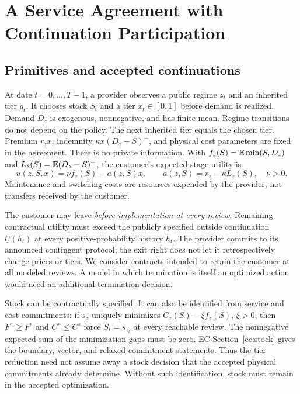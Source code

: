 \documentclass[11pt,letterpaper]{article}
\theoremstyle{definition}\newtheorem{assumption}[theorem]{Assumption}
\begin{document}
\section{A Service Agreement with Continuation Participation}\label{sec:model}
\subsection{Primitives and accepted continuations}
At date $t=0,\ldots,T-1$, a provider observes a public regime $z_t$ and an inherited tier $q_t$. It chooses stock $S_t$ and a tier $x_t\in[0,1]$ before demand is realized. Demand $D_z$ is exogenous, nonnegative, and has finite mean. Regime transitions do not depend on the policy. The next inherited tier equals the chosen tier. Premium $r_zx$, indemnity $\kappa x(D_z-S)^+$, and physical cost parameters are fixed in the agreement. There is no private information. With $f_z(S)=\mathbb E\min(S,D_z)$ and $L_z(S)=\mathbb E(D_z-S)^+$, the customer's expected stage utility is
\begin{equation}\label{eq:customer}
 u(z,S,x)=\nu f_z(S)-a(z,S)x,\qquad a(z,S)=r_z-\kappa L_z(S),\quad \nu>0.
\end{equation}
Maintenance and switching costs are resources expended by the provider, not transfers received by the customer.

The customer may leave \emph{before implementation at every review}. Remaining contractual utility must exceed the publicly specified outside continuation $\underline U(h_t)$ at every positive-probability history $h_t$. The provider commits to its announced contingent protocol; the exit right does not let it retrospectively change prices or tiers. We consider contracts intended to retain the customer at all modeled reviews. A model in which termination is itself an optimized action would need an additional termination decision.

Stock can be contractually specified. It can also be identified from service and cost commitments: if $s_z$ uniquely minimizes $C_z(S)-\xi f_z(S)$, $\xi>0$, then $F^\pi\geq F^s$ and $C^\pi\leq C^s$ force $S_t=s_{z_t}$ at every reachable review. The nonnegative expected sum of the minimization gaps must be zero. EC Section~\ref{ec:stock} gives the boundary, vector, and relaxed-commitment statements. Thus the tier reduction need not assume away a stock decision that the accepted physical commitments already determine. Without such identification, stock must remain in the accepted optimization.
\end{document}
